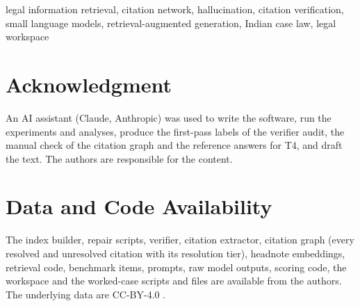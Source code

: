 \documentclass[conference]{IEEEtran}
\begin{document}
\begin{IEEEkeywords}
legal information retrieval, citation network, hallucination, citation verification, small language models, retrieval-augmented generation, Indian case law, legal workspace
\end{IEEEkeywords}



\clearpage


\section*{Acknowledgment}
An AI assistant (Claude, Anthropic) was used to write the software, run the experiments and analyses, produce the first-pass labels of the verifier audit, the manual check of the citation graph and the reference answers for T4, and draft the text. The authors are responsible for the content.

\section*{Data and Code Availability}
The index builder, repair scripts, verifier, citation extractor, citation graph (every resolved and unresolved citation with its resolution tier), headnote embeddings, retrieval code, benchmark items, prompts, raw model outputs, scoring code, the workspace and the worked-case scripts and files are available from the authors. The underlying data are CC-BY-4.0 \cite{awssc,awshc}.



\end{document}
